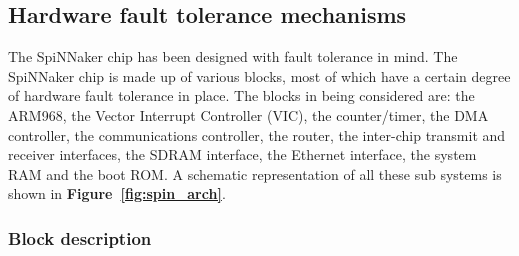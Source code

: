\documentclass[a4paper, 11pt]{article}
\begin{document}
\subsection{Hardware fault tolerance mechanisms}
The SpiNNaker chip has been designed with fault tolerance in mind. The SpiNNaker chip is made up of various blocks, most of which have a certain degree of hardware fault tolerance in place. The blocks in being considered are: the ARM968, the Vector Interrupt Controller (VIC), the counter/timer, the DMA controller, the communications controller, the router, the inter-chip transmit and receiver interfaces, the SDRAM interface, the Ethernet interface, the system RAM and the boot ROM. A schematic representation of all these sub systems is shown in \textbf{Figure~\ref{fig:spin_arch}}.

\subsubsection{Block description}
\end{document}
